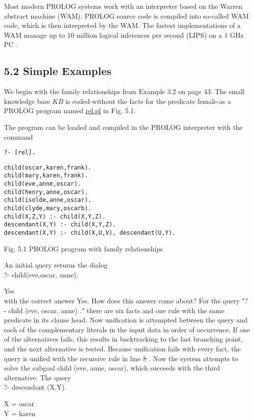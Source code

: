\documentclass[10pt]{article}
\begin{document}
Most modern PROLOG systems work with an interpreter based on the Warren abstract machine (WAM). PROLOG source code is compiled into so-called WAM code, which is then interpreted by the WAM. The fastest implementations of a WAM manage up to 10 million logical inferences per second (LIPS) on a 1 GHz PC .

\subsection*{5.2 Simple Examples}
We begin with the family relationships from Example 3.2 on page 43. The small knowledge base $K B$ is coded-without the facts for the predicate female-as a PROLOG program named \href{http://rel.pl}{rel.pl} in Fig. 5.1.

The program can be loaded and compiled in the PROLOG interpreter with the command

\begin{verbatim}
?- [rel].
\end{verbatim}

\begin{verbatim}
child(oscar,karen,frank).
child(mary,karen,frank).
child(eve,anne,oscar).
child(henry,anne,oscar).
child(isolde,anne,oscar).
child(clyde,mary,oscarb).
child(X,Z,Y) :- child(X,Y,Z).
descendant(X,Y) :- child(X,Y,Z).
descendant(X,Y) :- child(X,U,V), descendant(U,Y).
\end{verbatim}

Fig. 5.1 PROLOG program with family relationships

An initial query returns the dialog\\
?- child(eve,oscar, anne).

Yes\\
with the correct answer Yes. How does this answer come about? For the query "? - child (eve, oscar, anne) ." there are six facts and one rule with the same predicate in its clause head. Now unification is attempted between the query and each of the complementary literals in the input data in order of occurrence. If one of the alternatives fails, this results in backtracking to the last branching point, and the next alternative is tested. Because unification fails with every fact, the query is unified with the recursive rule in line 8 . Now the system attempts to solve the subgoal child (eve, anne, oscar), which succeeds with the third alternative. The query\\
?- descendant (X,Y).

X = oscar\\
Y = karen
\end{document}
